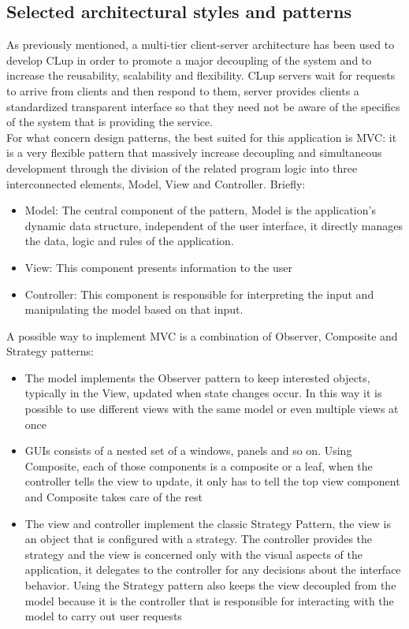 \subsection{Selected architectural styles and patterns}
As previously mentioned, a multi-tier client-server architecture has been used to develop CLup in order to promote a major decoupling of the system and to increase the reusability, scalability and
flexibility. CLup servers wait for requests to arrive from clients and then respond to them, server provides clients a standardized transparent interface so that they need not be aware of the specifics of the system that is providing the service.\\
For what concern design patterns, the best suited for this application is MVC: it is a very flexible pattern that massively increase decoupling and simultaneous development through the division of the related program logic into three interconnected elements, Model, View and Controller.
Briefly: \begin{itemize}
	\item Model: The central component of the pattern, Model is the application's dynamic data structure, independent of the user interface, it directly manages the data, logic and rules of the application.
	\item View: This component presents information to the user
	\item Controller: This component is responsible for interpreting the input and manipulating the model based on that input.
	\end{itemize}
A possible way to implement MVC is a combination of Observer, Composite and Strategy patterns:
\begin{itemize}
	\item The model implements the Observer pattern to keep interested objects, typically in the View, updated when state changes occur. In this way it is possible to use different views with the same model or even multiple views at once
	\item GUIs consists of a nested set of a windows, panels and so on. Using Composite, each of those components is a composite or a leaf, when the controller tells the view to update, it only has to tell the top view component and Composite takes care of the rest
	\item The view and controller implement the classic Strategy Pattern, the view is an object that is configured with a strategy. The controller provides the strategy and the view is concerned only with the visual aspects of the application, it delegates to the controller for any decisions about the interface behavior. Using the Strategy pattern also keeps the view decoupled from the model because it is the controller that is responsible for interacting with the model to carry out user requests 
\end{itemize}

